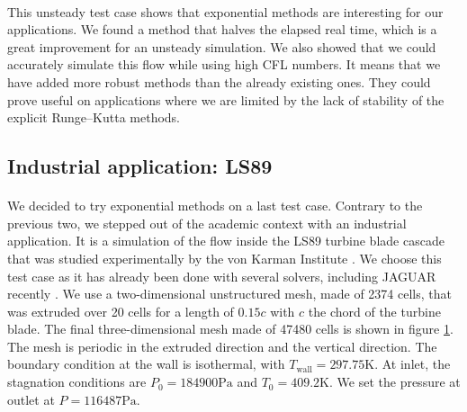       \paragraph{}
      This unsteady test case shows that exponential methods are interesting for our applications.
      We found a method that halves the elapsed real time, which is a great improvement for an unsteady simulation.
      We also showed that we could accurately simulate this flow while using high CFL numbers.
      It means that we have added more robust methods than the already existing ones.
      They could prove useful on applications where we are limited by the lack of stability of the explicit Runge--Kutta methods.


    \subsection{Industrial application: LS89}


      \paragraph{}
      We decided to try exponential methods on a last test case.
      Contrary to the previous two, we stepped out of the academic context with an industrial application.
      It is a simulation of the flow inside the LS89 turbine blade cascade that was studied experimentally by the von Karman Institute \cite{ArtsLambertdeRouvroit1992}.
      We choose this test case as it has already been done with several solvers, including JAGUAR recently \cite{BrunetCronerMinotEtAl2018}.
      We use a two-dimensional unstructured mesh, made of \num{2374} cells, that was extruded over 20 cells for a length of $0.15 c$ with $c$ the chord of the turbine blade.
      The final three-dimensional mesh made of \num{47480} cells is shown in figure \ref{fig:ls89_mesh}.
      The mesh is periodic in the extruded direction and the vertical direction.
      The boundary condition at the wall is isothermal, with $T_\textrm{wall} = 297.75 \si{\kelvin}$.
      At inlet, the stagnation conditions are $P_0 = \num{184900}\si{\pascal}$ and $T_0 = 409.2\si{\kelvin}$.
      We set the pressure at outlet at $P = \num{116487}\si{\pascal}$.


      \begin{figure}
        \centering
        \caption{}
        \label{fig:ls89_mesh}
      \end{figure}
